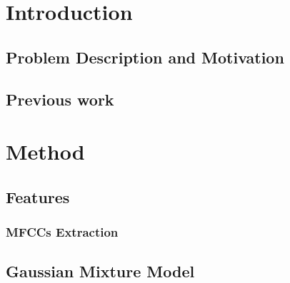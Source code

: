 \documentclass[11pt,a4paper]{tesis}
\begin{document}
\linespread{1.6}
\tableofcontents
\chapter{Introduction}
	\section{Problem Description and Motivation}
	\section{Previous work}
		
\chapter{Method}
	
	\section{Features}
		\subsection{MFCCs Extraction}
		
	\section{Gaussian Mixture Model}
	
\end{document}
